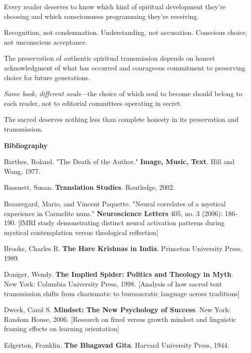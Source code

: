 \documentclass[12pt,twoside]{book}
\begin{document}
Every reader deserves to know which kind of spiritual development they're choosing and which consciousness programming they're receiving.

Recognition, not condemnation. Understanding, not accusation. Conscious choice, not unconscious acceptance.

The preservation of authentic spiritual transmission depends on honest acknowledgment of what has occurred and courageous commitment to preserving choice for future generations.

\textit{Same book, different souls}—the choice of which soul to become should belong to each reader, not to editorial committees operating in secret.

The sacred deserves nothing less than complete honesty in its preservation and transmission.

\clearpage
\thispagestyle{empty}
\mbox{}
\newpage
\pagestyle{sectionopening}
\thispagestyle{sectionopening}
\markboth{}{}
\markright{}
\vspace*{0.25\textheight}
\begin{center}
{\Huge\bfseries Bibliography}
\end{center}
\newpage
\pagestyle{sectionopening}
\thispagestyle{sectionopening}

Barthes, Roland. "The Death of the Author." \textbf{Image, Music, Text}. Hill and Wang, 1977.

Bassnett, Susan. \textbf{Translation Studies}. Routledge, 2002.

Beauregard, Mario, and Vincent Paquette. "Neural correlates of a mystical experience in Carmelite nuns." \textbf{Neuroscience Letters} 405, no. 3 (2006): 186-190. [fMRI study demonstrating distinct neural activation patterns during mystical contemplation versus theological reflection]

Brooks, Charles R. \textbf{The Hare Krishnas in India}. Princeton University Press, 1989.

Doniger, Wendy. \textbf{The Implied Spider: Politics and Theology in Myth}. New York: Columbia University Press, 1998. [Analysis of how sacred text transmission shifts from charismatic to bureaucratic language across traditions]

Dweck, Carol S. \textbf{Mindset: The New Psychology of Success}. New York: Random House, 2006. [Research on fixed versus growth mindset and linguistic framing effects on learning orientation]

Edgerton, Franklin. \textbf{The Bhagavad Gita}. Harvard University Press, 1944.
\end{document}
